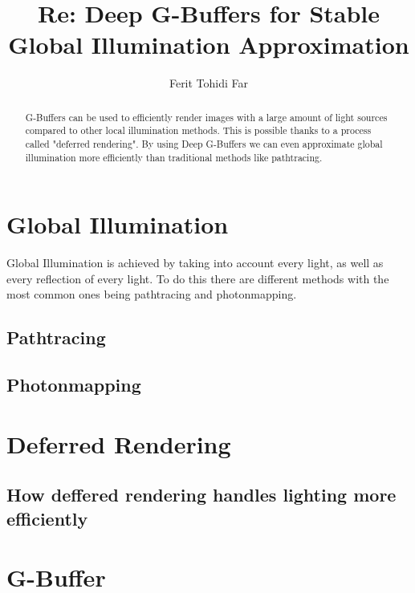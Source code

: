 \documentclass{ACGSeminar}
\begin{document}
\title{Re: Deep G-Buffers for Stable Global Illumination Approximation}

\author{Ferit Tohidi Far}

\maketitle


\begin{abstract}%
G-Buffers can be used to efficiently render images with a large amount of light sources compared to other local illumination methods. This is possible thanks to a 
process called "deferred rendering". By using Deep G-Buffers we can even approximate global illumination more efficiently than traditional methods like pathtracing. 
\end{abstract}

\tableofcontents

\newpage

\label{cha:introduction}
\section{Global Illumination}
	Global Illumination is achieved by taking into account every light, as well as every reflection of every light. To do this there are different methods with the
	most common ones being pathtracing and photonmapping.
	\subsection{Pathtracing}
		
	\subsection{Photonmapping}
\section{Deferred Rendering}
	\subsection{How deffered rendering handles lighting more efficiently}

\section{G-Buffer}
\end{document}
